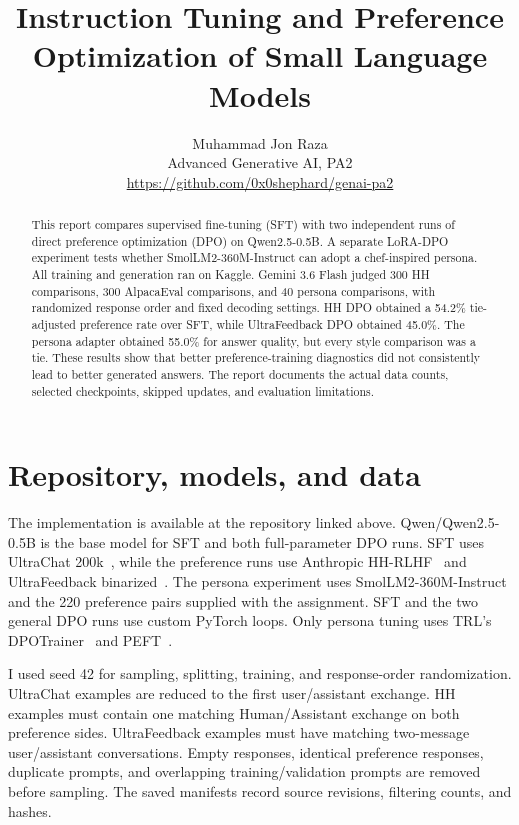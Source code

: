 \documentclass{article}
\title{Instruction Tuning and Preference Optimization of Small Language Models}
\author{Muhammad Jon Raza\\
Advanced Generative AI, PA2\\
\url{https://github.com/0x0shephard/genai-pa2}}
\begin{document}
\maketitle
\begin{abstract}
This report compares supervised fine-tuning (SFT) with two independent runs of direct preference optimization (DPO) on Qwen2.5-0.5B. A separate LoRA-DPO experiment tests whether SmolLM2-360M-Instruct can adopt a chef-inspired persona. All training and generation ran on Kaggle. Gemini 3.6 Flash judged 300 HH comparisons, 300 AlpacaEval comparisons, and 40 persona comparisons, with randomized response order and fixed decoding settings. HH DPO obtained a 54.2\% tie-adjusted preference rate over SFT, while UltraFeedback DPO obtained 45.0\%. The persona adapter obtained 55.0\% for answer quality, but every style comparison was a tie. These results show that better preference-training diagnostics did not consistently lead to better generated answers. The report documents the actual data counts, selected checkpoints, skipped updates, and evaluation limitations.
\end{abstract}

\section{Repository, models, and data}
The implementation is available at the repository linked above. Qwen/Qwen2.5-0.5B is the base model for SFT and both full-parameter DPO runs. SFT uses UltraChat 200k~\cite{ultrachat}, while the preference runs use Anthropic HH-RLHF~\cite{hh} and UltraFeedback binarized~\cite{uf}. The persona experiment uses SmolLM2-360M-Instruct and the 220 preference pairs supplied with the assignment. SFT and the two general DPO runs use custom PyTorch loops. Only persona tuning uses TRL's DPOTrainer~\cite{trl} and PEFT~\cite{peft}.

I used seed 42 for sampling, splitting, training, and response-order randomization. UltraChat examples are reduced to the first user/assistant exchange. HH examples must contain one matching Human/Assistant exchange on both preference sides. UltraFeedback examples must have matching two-message user/assistant conversations. Empty responses, identical preference responses, duplicate prompts, and overlapping training/validation prompts are removed before sampling. The saved manifests record source revisions, filtering counts, and hashes.

\begin{table}[ht]
\centering
\caption{Prepared and effective dataset sizes, and submitted checkpoints.}
\label{tab:data}

\end{table}
\end{document}
